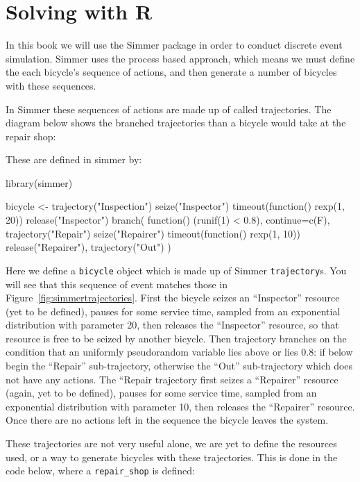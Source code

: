 \section{Solving with R}\label{sec:solving-with-R}

In this book we will use the Simmer package in order to conduct discrete event
simulation.
Simmer uses the process based approach, which means we must define the each
bicycle's sequence of actions, and then generate a number of bicycles with these
sequences.

In Simmer these sequences of actions are made up of called trajectories. The
diagram below shows the branched trajectories than a bicycle would take at the
repair shop:


These are defined in simmer by:

\begin{Rin}
library(simmer)

bicycle <-
  trajectory("Inspection") %
  seize("Inspector") %
  timeout(function() {rexp(1, 20)}) %
  release("Inspector") %
  branch(
    function() (runif(1) < 0.8), continue=c(F),
    trajectory("Repair") %
      seize("Repairer") %
      timeout(function() {rexp(1, 10)}) %
      release("Repairer"),
    trajectory("Out")
  )
\end{Rin}

Here we define a \texttt{bicycle} object which is made up of Simmer
\texttt{trajectory}s. You will see that this sequence of event matches
those in Figure~\ref{fig:simmertrajectories}.
First the bicycle seizes an ``Inspector'' resource (yet to be defined), pauses
for some service time, sampled from an exponential distribution with parameter
20, then releases the ``Inspector'' resource, so that resource is free to be
seized by another bicycle.
Then trajectory branches on the condition that an uniformly pseudorandom
variable lies above or lies 0.8: if below begin the ``Repair'' sub-trajectory,
otherwise the ``Out'' sub-trajectory which does not have any actions.
The ``Repair trajectory first seizes a ``Repairer'' resource (again, yet to be
defined), pauses for some service time, sampled from an exponential
distribution with parameter 10, then releases the ``Repairer'' resource. Once
there are no actions left in the sequence the bicycle leaves the system.

These trajectories are not very useful alone, we are yet to define the resources
used, or a way to generate bicycles with these trajectories. This is done in the
code below, where a \texttt{repair_shop} is defined:


